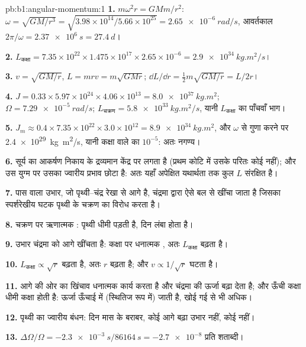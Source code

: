 \begin{solution}{pb:b1:angular-momentum:1}
\textbf{1.} $m\omega^2r = GMm/r^2$: $\omega = \sqrt{GM/r^3} = \sqrt{3.98\times
10^{14}/5.66\times10^{25}} = \qty{2.65e-6}{rad/s}$, आवर्तकाल $2\pi/\omega =
\qty{2.37e6}{s} = \qty{27.4}{d}$।

\textbf{2.} $L_{\text{कक्षा}} = 7.35\times10^{22} \times 1.475\times10^{17}
\times 2.65\times10^{-6} = \qty{2.9e34}{kg.m^2/s}$।

\textbf{3.} $v = \sqrt{GM/r}$, $L = mrv = m\sqrt{GMr}$; $\dd L/\dd r =
\tfrac12 m\sqrt{GM/r} = L/2r$।

\textbf{4.} $J = 0.33 \times 5.97\times10^{24} \times 4.06\times10^{13} =
\qty{8.0e37}{kg.m^2}$; $\Omega = \qty{7.29e-5}{rad/s}$; $L_{\text{चक्रण}} =
\qty{5.8e33}{kg.m^2/s}$, यानी $L_{\text{कक्षा}}$ का पाँचवाँ भाग।

\textbf{5.} $J_m \approx 0.4 \times 7.35\times10^{22} \times 3.0\times10^{12} =
\qty{8.9e34}{kg.m^2}$, और $\omega$ से गुणा करने पर \qty{2.4e29}{kg.m^2/s}, यानी
कक्षा वाले का $10^{-5}$: अतः नगण्य।

\textbf{6.} सूर्य का आकर्षण निकाय के द्रव्यमान केंद्र पर लगता है (प्रथम
कोटि में उसके परितः कोई  नहीं); और उस युग्म पर उसका ज्वारीय प्रभाव
छोटा है: अतः यहाँ अपेक्षित यथार्थता तक कुल $L$ संरक्षित है।

\textbf{7.} पास वाला उभार, जो पृथ्वी--चंद्र रेखा से आगे है, चंद्रमा द्वारा
ऐसे बल से खींचा जाता है जिसका स्पर्शरेखीय घटक पृथ्वी के चक्रण का विरोध
करता है।

\textbf{8.} चक्रण पर ऋणात्मक : पृथ्वी धीमी पड़ती है, दिन लंबा होता
है।

\textbf{9.} उभार चंद्रमा को आगे खींचता है: कक्षा पर धनात्मक , अतः
$L_{\text{कक्षा}}$ बढ़ता है।

\textbf{10.} $L_{\text{कक्षा}} \propto \sqrt r$ बढ़ता है, अतः $r$ बढ़ता है; और $v \propto
1/\sqrt r$ घटता है।

\textbf{11.} आगे की ओर का खिंचाव धनात्मक कार्य करता है और चंद्रमा की ऊर्जा
बढ़ा देता है; और ऊँची कक्षा धीमी कक्षा होती है: ऊर्जा ऊँचाई में (स्थितिज
रूप में) जाती है, खोई गई  से भी अधिक।

\textbf{12.} पृथ्वी का ज्वारीय बंधन: दिन मास के बराबर, कोई आगे बढ़ा उभार
नहीं, कोई  नहीं।

\textbf{13.} $\Delta\Omega/\Omega = -\qty{2.3e-3}{s}/\qty{86164}{s} =
\num{-2.7e-8}$ प्रति शताब्दी।


\end{solution}
